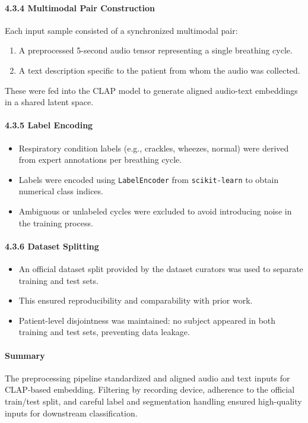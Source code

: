 \paragraph{4.3.4 Multimodal Pair Construction\\}
Each input sample consisted of a synchronized multimodal pair:
\begin{enumerate}
    \item A preprocessed 5-second audio tensor representing a single breathing cycle.
    \item A text description specific to the patient from whom the audio was collected.
\end{enumerate}
These were fed into the CLAP model to generate aligned audio-text embeddings in a shared latent space.

\paragraph{4.3.5 Label Encoding\\}
\begin{itemize}
    \item Respiratory condition labels (e.g., crackles, wheezes, normal) were derived from expert annotations per breathing cycle.
    \item Labels were encoded using \texttt{LabelEncoder} from \texttt{scikit-learn} to obtain numerical class indices.
    \item Ambiguous or unlabeled cycles were excluded to avoid introducing noise in the training process.
\end{itemize}

\paragraph{4.3.6 Dataset Splitting\\}
\begin{itemize}
    \item An official dataset split provided by the dataset curators was used to separate training and test sets.
    \item This ensured reproducibility and comparability with prior work.
    \item Patient-level disjointness was maintained: no subject appeared in both training and test sets, preventing data leakage.
\end{itemize}

\paragraph{Summary}
The preprocessing pipeline standardized and aligned audio and text inputs for CLAP-based embedding. Filtering by recording device, adherence to the official train/test split, and careful label and segmentation handling ensured high-quality inputs for downstream classification.
